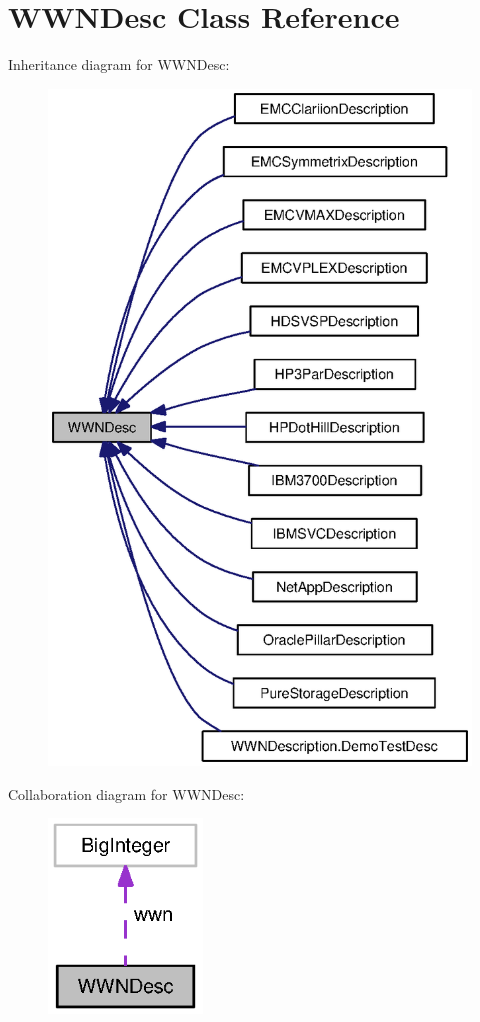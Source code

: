 \section{W\-W\-N\-Desc Class Reference}
\label{classorg_1_1smallfoot_1_1wwn_1_1WWNDesc}


Inheritance diagram for W\-W\-N\-Desc\-:\nopagebreak
\begin{figure}[H]
\begin{center}
\leavevmode
\includegraphics[width=340pt]{classorg_1_1smallfoot_1_1wwn_1_1WWNDesc__inherit__graph}
\end{center}
\end{figure}


Collaboration diagram for W\-W\-N\-Desc\-:\nopagebreak
\begin{figure}[H]
\begin{center}
\leavevmode
\includegraphics[width=116pt]{classorg_1_1smallfoot_1_1wwn_1_1WWNDesc__coll__graph}
\end{center}
\end{figure}
